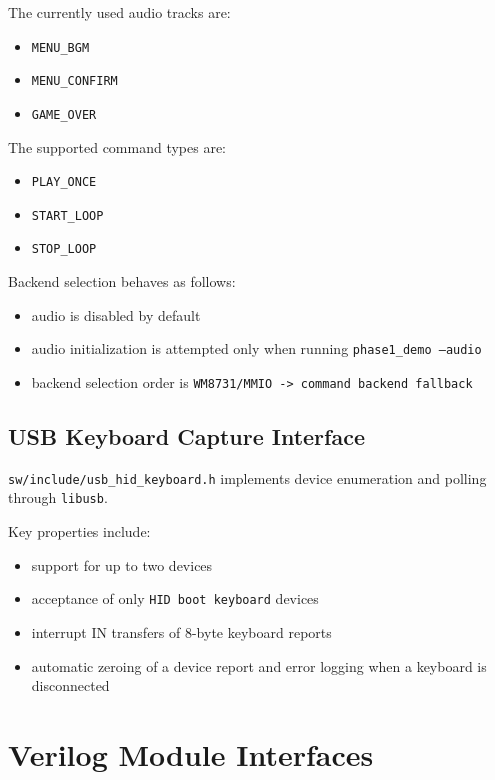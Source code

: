 \documentclass[12pt,a4paper]{article}
\begin{document}
The currently used audio tracks are:

\begin{itemize}
  \item \texttt{MENU\_BGM}
  \item \texttt{MENU\_CONFIRM}
  \item \texttt{GAME\_OVER}
\end{itemize}

The supported command types are:

\begin{itemize}
  \item \texttt{PLAY\_ONCE}
  \item \texttt{START\_LOOP}
  \item \texttt{STOP\_LOOP}
\end{itemize}

Backend selection behaves as follows:

\begin{itemize}
  \item audio is disabled by default
  \item audio initialization is attempted only when running \texttt{phase1\_demo --audio}
  \item backend selection order is \texttt{WM8731/MMIO -> command backend fallback}
\end{itemize}

\subsection{USB Keyboard Capture Interface}

\texttt{sw/include/usb\_hid\_keyboard.h} implements device enumeration and polling through \texttt{libusb}.

Key properties include:

\begin{itemize}
  \item support for up to two devices
  \item acceptance of only \texttt{HID boot keyboard} devices
  \item interrupt IN transfers of 8-byte keyboard reports
  \item automatic zeroing of a device report and error logging when a keyboard is disconnected
\end{itemize}

\section{Verilog Module Interfaces}
\end{document}
